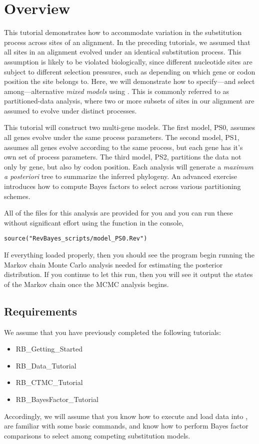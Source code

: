 \section{Overview}


This tutorial demonstrates how to accommodate variation in the substitution process across sites of an alignment.
In the preceding tutorials, we assumed that all sites in an alignment evolved under an identical substitution process.
This assumption is likely to be violated biologically, since different nucleotide sites are subject to different selection pressures, such as depending on which gene or codon position the site belongs to.
Here, we will demonstrate how to specify---and select among---alternative \emph{mixed models} using \RevBayes.
This is commonly referred to as partitioned-data analysis, where two or more subsets of sites in our alignment are assumed to evolve under distinct processes.

This tutorial will construct two multi-gene models.
The first model, PS0, assumes all genes evolve under the same process parameters.
The second model, PS1, assumes all genes evolve according to the same process, but each gene has it's own set of process parameters.
The third model, PS2, partitions the data not only by gene, but also by codon position.
Each analysis will generate a {\it maximum a posteriori} tree to summarize the inferred phylogeny.
An advanced exercise introduces how to compute Bayes factors to select across various partitioning schemes.

All of the files for this analysis are provided for you and you can run these without significant effort using the  function in the \RevBayes console, \EG
{\tt \begin{snugshade*}
\begin{lstlisting}
source("RevBayes_scripts/model_PS0.Rev")
\end{lstlisting}
\end{snugshade*}}

If everything loaded properly, then you should see the program begin running the Markov chain Monte Carlo analysis needed for estimating the posterior distribution. If you continue to let this run, then you will see it output the states of the Markov chain once the MCMC analysis begins.

\subsection{Requirements}
We assume that you have previously completed the following tutorials:
\begin{itemize}
\item RB\_Getting\_Started
\item RB\_Data\_Tutorial
\item RB\_CTMC\_Tutorial
\item RB\_BayesFactor\_Tutorial
\end{itemize}
Accordingly, we will assume that you know how to execute and load data into \RevBayes, are familiar with some basic commands, and know how to perform Bayes factor comparisons to select among competing substitution models.



